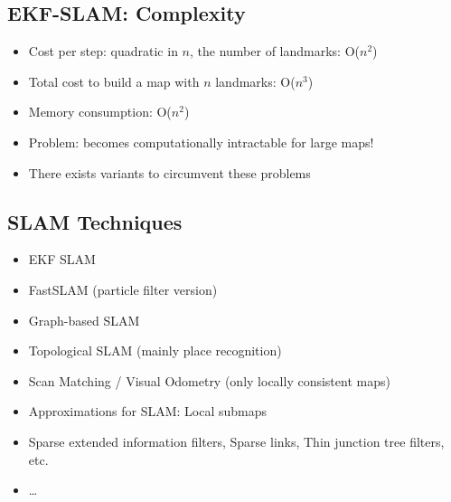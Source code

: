 \documentclass[10pt]{article}
\begin{document}
\subsection*{EKF-SLAM: Complexity}
\begin{itemize}
	\item Cost per step: quadratic in $n$, the number of landmarks: O($n^2$)
	\item Total cost to build a map with $n$ landmarks: O($n^3$)
	\item Memory consumption: O($n^2$)
	\item Problem: becomes computationally intractable for large maps!
	\item There exists variants to circumvent these problems
\end{itemize}

\subsection*{SLAM Techniques}
\begin{itemize}
	\item EKF SLAM
	\item FastSLAM (particle filter version)
	\item Graph-based SLAM
	\item Topological SLAM (mainly place recognition)
	\item Scan Matching / Visual Odometry (only locally consistent maps)
	\item Approximations for SLAM: Local submaps
	\item Sparse extended information filters, Sparse links, Thin junction tree filters, etc.
	\item \dots
\end{itemize}
\end{document}
